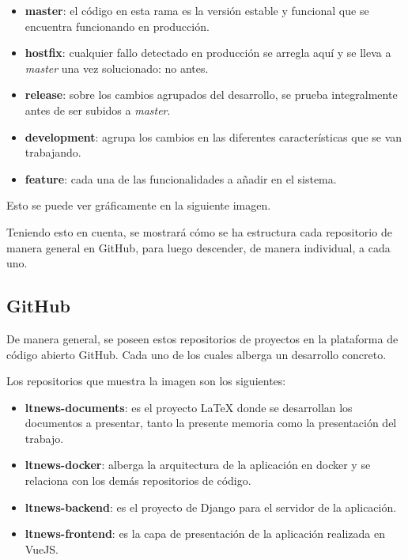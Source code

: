 \begin{itemize}
    \item \textbf{master}: el código en esta rama es la versión estable y funcional que se encuentra funcionando en producción.
    \item \textbf{hostfix}: cualquier fallo detectado en producción se arregla aquí y se lleva a \textit{master} una vez solucionado: no antes.
    \item \textbf{release}: sobre los cambios agrupados del desarrollo, se prueba integralmente antes de ser subidos a \textit{master}.
    \item \textbf{development}: agrupa los cambios en las diferentes características que se van trabajando.
    \item \textbf{feature}: cada una de las funcionalidades a añadir en el sistema.
\end{itemize}

Esto se puede ver gráficamente en la siguiente imagen.


Teniendo esto en cuenta, se mostrará cómo se ha estructura cada repositorio de manera general en GitHub, para luego descender, de manera individual, a cada uno.

\subsection{GitHub}

De manera general, se poseen estos repositorios de proyectos en la plataforma de código abierto GitHub. Cada uno de los cuales alberga un desarrollo concreto.


Los repositorios que muestra la imagen son los siguientes:

\begin{itemize}
    \item \textbf{ltnews-documents}: es el proyecto LaTeX donde se desarrollan los documentos a presentar, tanto la presente memoria como la presentación del trabajo.
    \item \textbf{ltnews-docker}: alberga la arquitectura de la aplicación en docker y se relaciona con los demás repositorios de código.
    \item \textbf{ltnews-backend}: es el proyecto de Django para el servidor de la aplicación.
    \item \textbf{ltnews-frontend}: es la capa de presentación de la aplicación
     realizada en VueJS.
\end{itemize}

